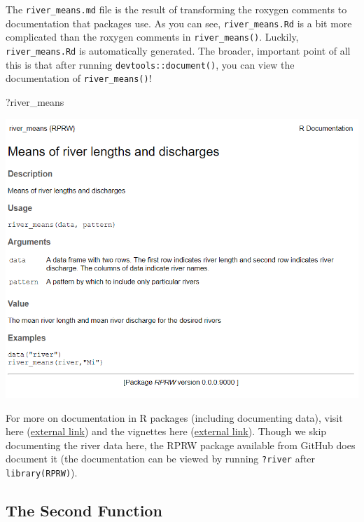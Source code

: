 \documentclass[
]{book}
\newenvironment{Shaded}{\begin{snugshade}}{\end{snugshade}}
\newcommand{\NormalTok}[1]{#1}
\begin{document}
The \texttt{river\_means.md} file is the result of transforming the roxygen comments to documentation that packages use. As you can see, \texttt{river\_means.Rd} is a bit more complicated than the roxygen comments in \texttt{river\_means()}. Luckily, \texttt{river\_means.Rd} is automatically generated. The broader, important point of all this is that after running \texttt{devtools::document()}, you can view the documentation of \texttt{river\_means()}!

\begin{Shaded}
\begin{Highlighting}[]
\NormalTok{?river_means}
\end{Highlighting}
\end{Shaded}

\includegraphics[width=1\linewidth]{images/newrpack_example}

For more on documentation in R packages (including documenting data), visit here (\href{https://r-pkgs.org/man.html\#man}{external link}) and the vignettes here (\href{https://cran.r-project.org/web/packages/roxygen2/index.html}{external link}). Though we skip documenting the river data here, the RPRW package available from GitHub does document it (the documentation can be viewed by running \texttt{?river} after \texttt{library(RPRW)}).

\hypertarget{second-function}{%
\subsection{The Second Function}\label{second-function}}
\end{document}
